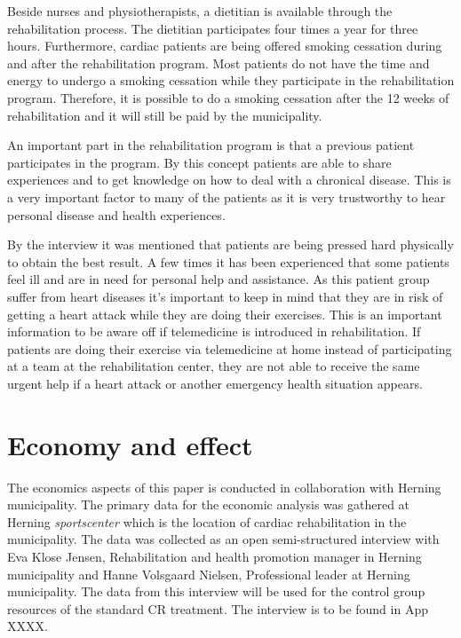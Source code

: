 Beside nurses and physiotherapists, a dietitian is available through the rehabilitation process. The dietitian participates four times a year for three hours. Furthermore, cardiac patients are being offered smoking cessation during and after the rehabilitation program. Most patients do not have the time and energy to undergo a smoking cessation while they participate in the rehabilitation program. Therefore, it is possible to do a smoking cessation after the 12 weeks of rehabilitation and it will still be paid by the municipality.   

An important part in the rehabilitation program is that a previous patient participates in the program. By this concept patients are able to share experiences and to get knowledge on how to deal with a chronical disease. This is a very important factor to many of the patients as it is very trustworthy to hear personal disease and health experiences. 

By the interview it was mentioned that patients are being pressed hard physically to obtain the best result. A few times it has been experienced that some patients feel ill and are in need for personal help and assistance. As this patient group suffer from heart diseases it’s important to keep in mind that they are in risk of getting a heart attack while they are doing their exercises. This is an important information to be aware off if telemedicine is introduced in rehabilitation. If patients are doing their exercise via telemedicine at home instead of participating at a team at the rehabilitation center, they are not able to receive the same urgent help if a heart attack or another emergency health situation appears.         

\section{Economy and effect}

The economics aspects of this paper is conducted in collaboration with Herning municipality. The primary data for the economic analysis was gathered at Herning \textit{sportscenter} which is the location of cardiac rehabilitation in the municipality. The data was collected as an open semi-structured interview with Eva Klose Jensen, Rehabilitation and health promotion manager in Herning municipality and Hanne Volsgaard Nielsen, Professional leader at Herning municipality. The data from this interview will be used for the control group resources of the standard CR treatment. The interview is to be found in App XXXX. 


